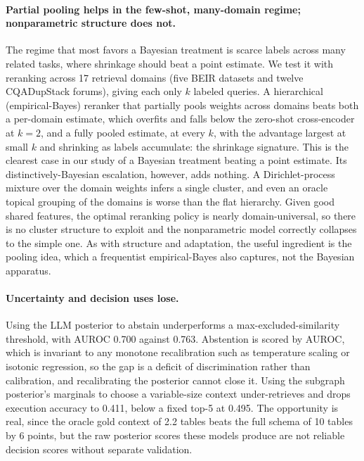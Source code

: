 \documentclass[11pt]{article}
\begin{document}
\paragraph{Partial pooling helps in the few-shot, many-domain regime; nonparametric structure does not.}
The regime that most favors a Bayesian treatment is scarce labels across many related tasks, where
shrinkage should beat a point estimate. We test it with reranking across 17 retrieval domains (five BEIR
datasets and twelve CQADupStack forums), giving each only $k$ labeled queries. A hierarchical
(empirical-Bayes) reranker that partially pools weights across domains beats both a per-domain estimate,
which overfits and falls below the zero-shot cross-encoder at $k\!=\!2$, and a fully pooled estimate, at
every $k$, with the advantage largest at small $k$ and shrinking as labels accumulate: the shrinkage
signature. This is the clearest case in our study of a Bayesian treatment beating a point estimate. Its
distinctively-Bayesian escalation, however, adds nothing. A Dirichlet-process mixture over the domain
weights infers a single cluster, and even an oracle topical grouping of the domains is worse than the
flat hierarchy. Given good shared features, the optimal reranking policy is nearly domain-universal, so
there is no cluster structure to exploit and the nonparametric model correctly collapses to the simple
one. As with structure and adaptation, the useful ingredient is the pooling idea, which a frequentist
empirical-Bayes also captures, not the Bayesian apparatus.

\paragraph{Uncertainty and decision uses lose.} Using the LLM posterior to abstain underperforms a
max-excluded-similarity threshold, with AUROC 0.700 against 0.763. Abstention is scored by AUROC, which
is invariant to any monotone recalibration such as temperature scaling or isotonic regression, so the
gap is a deficit of discrimination rather than calibration, and recalibrating the posterior cannot
close it. Using the subgraph posterior's marginals to choose a variable-size context under-retrieves
and drops execution accuracy to 0.411, below a fixed top-5 at 0.495. The opportunity is real, since the
oracle gold context of 2.2 tables beats the full schema of 10 tables by 6 points, but the raw posterior
scores these models produce are not reliable decision scores without separate validation.
\end{document}
